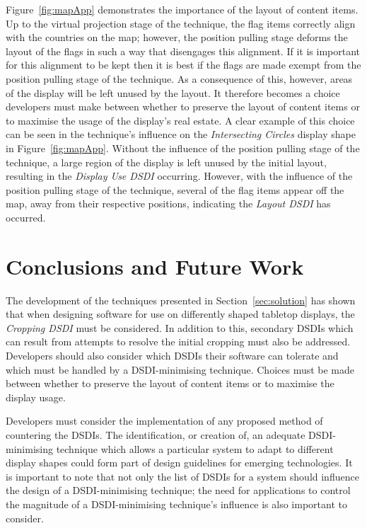 \documentclass[twocolumn,compsoc]{cvm}
\begin{document}
{Figure~\ref{fig:mapApp} demonstrates the importance of the layout of content items.
Up to the virtual projection stage of the technique, the flag items correctly align with the countries on the map; however, the position pulling stage deforms the layout of the flags in such a way that disengages this alignment.
If it is important for this alignment to be kept then it is best if the flags are made exempt from the position pulling stage of the technique.
As a consequence of this, however, areas of the display will be left unused by the layout.
It therefore becomes a choice developers must make between whether to preserve the layout of content items or to maximise the usage of the display's real estate.
A clear example of this choice can be seen in the technique's influence on the {\emph{Intersecting Circles}} display shape in Figure~\ref{fig:mapApp}.
Without the influence of the position pulling stage of the technique, a large region of the display is left unused by the initial layout, resulting in the {\emph{Display Use \ac{DSDI}}} occurring.
However, with the influence of the position pulling stage of the technique, several of the flag items appear off the map, away from their respective positions, indicating the {\emph{Layout \ac{DSDI}}} has occurred.


\section{Conclusions and Future Work}
\label{sec:conclusion}

The development of the techniques presented in Section~\ref{sec:solution} has shown that when designing software for use on differently shaped tabletop displays, the {\emph{Cropping \ac{DSDI}}} must be considered.
In addition to this, secondary \acp{DSDI} which can result from attempts to resolve the initial cropping must also be addressed.
Developers should also consider which \acp{DSDI} their software can tolerate and which must be handled by a \ac{DSDI}-minimising technique.
Choices must be made between whether to preserve the layout of content items or to maximise the display usage.

Developers must consider the implementation of any proposed method of countering the \acp{DSDI}.
The identification, or creation of, an adequate \ac{DSDI}-minimising technique which allows a particular system to adapt to different display shapes could form part of design guidelines for emerging technologies.
It is important to note that not only the list of \acp{DSDI} for a system should influence the design of a \ac{DSDI}-minimising technique; the need for applications to control the magnitude of a \ac{DSDI}-minimising technique's influence is also important to consider.

}
\end{document}
